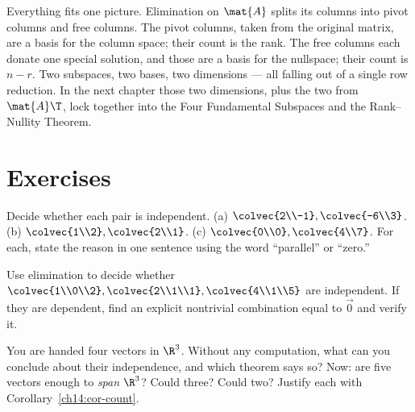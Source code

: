Everything fits one picture. Elimination on $\mat{A}$ splits its columns into
pivot columns and free columns. The pivot columns, taken from the original
matrix, are a basis for the column space; their count is the rank. The free
columns each donate one special solution, and those are a basis for the
nullspace; their count is $n - r$. Two subspaces, two bases, two dimensions ---
all falling out of a single row reduction. In the next chapter those two
dimensions, plus the two from $\mat{A}\T$, lock together into the Four
Fundamental Subspaces and the Rank--Nullity Theorem.

\section*{Exercises}

\begin{exercise}
\label{ch14:exr-parallel}
Decide whether each pair is independent. (a) $\colvec{2\\-1},\colvec{-6\\3}$.
(b) $\colvec{1\\2},\colvec{2\\1}$. (c) $\colvec{0\\0},\colvec{4\\7}$. For each,
state the reason in one sentence using the word ``parallel'' or ``zero.''
\end{exercise}

\begin{exercise}
\label{ch14:exr-test}
Use elimination to decide whether $\colvec{1\\0\\2},\colvec{2\\1\\1},
\colvec{4\\1\\5}$ are independent. If they are dependent, find an explicit
nontrivial combination equal to $\vec{0}$ and verify it.
\end{exercise}

\begin{exercise}
\label{ch14:exr-count}
You are handed four vectors in $\R^3$. Without any computation, what can you
conclude about their independence, and which theorem says so? Now: are five
vectors enough to \emph{span} $\R^3$? Could three? Could two? Justify each with
Corollary~\ref{ch14:cor-count}.
\end{exercise}


